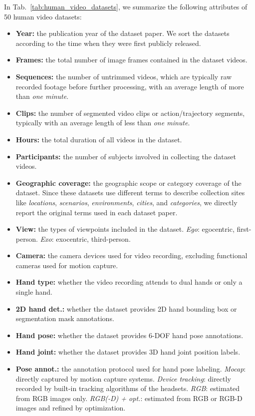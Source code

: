 \documentclass[Afour,sageh,times]{sagej}
\begin{document}
In Tab.~\ref{tab:human_video_datasets}, we summarize the following attributes of 50 human video datasets:
\begin{itemize}[leftmargin=1em]
    \setlength{\parskip}{0pt}
    \renewcommand\labelitemi{\(\circ\)}
    \item \textbf{Year:} the publication year of the dataset paper. We sort the datasets according to the time when they were first publicly released.
    \item \textbf{Frames:} the total number of image frames contained in the dataset videos.
    \item \textbf{Sequences:} the number of untrimmed videos, which are typically raw recorded footage before further processing, with an average length of more than \textit{one minute}.
    \item \textbf{Clips:} the number of segmented video clips or action/trajectory segments, typically with an average length of less than \textit{one minute}.
    \item \textbf{Hours:} the total duration of all videos in the dataset.
    \item \textbf{Participants:} the number of subjects involved in collecting the dataset videos.
    \item \textbf{Geographic coverage:} the geographic scope or category coverage of the dataset. Since these datasets use different terms to describe collection sites like \textit{locations}, \textit{scenarios}, \textit{environments}, \textit{cities}, and \textit{categories}, we directly report the original terms used in each dataset paper.
    \item \textbf{View:} the types of viewpoints included in the dataset. \textit{Ego}: egocentric, first-person. \textit{Exo}: exocentric, third-person.
    \item \textbf{Camera:} the camera devices used for video recording, excluding functional cameras used for motion capture.
    \item \textbf{Hand type:} whether the video recording attends to dual hands or only a single hand.
    \item \textbf{2D hand det.:} whether the dataset provides 2D hand bounding box or segmentation mask annotations.
    \item \textbf{Hand pose:} whether the dataset provides 6-DOF hand pose annotations.
    \item \textbf{Hand joint:} whether the dataset provides 3D hand joint position labels.
    \item \textbf{Pose annot.:} the annotation protocol used for hand pose labeling. \textit{Mocap}: directly captured by motion capture systems. \textit{Device tracking}: directly recorded by built-in tracking algorithms of the headsets. \textit{RGB}: estimated from RGB images only. \textit{RGB(-D) + opt.}: estimated from RGB or RGB-D images and refined by optimization.

\end{itemize}
\end{document}
